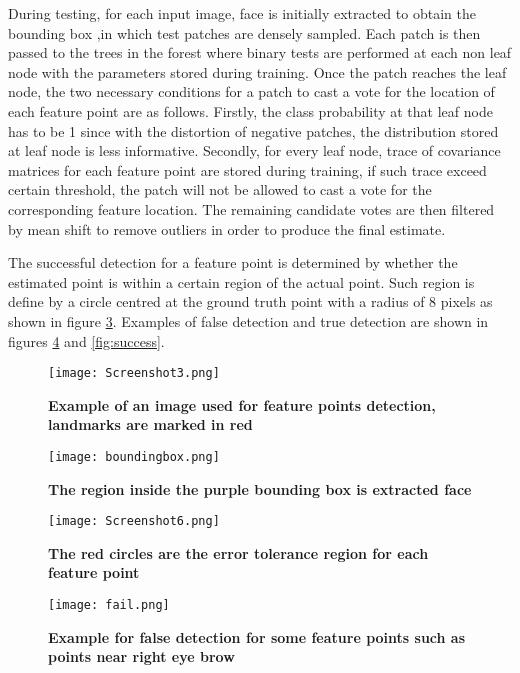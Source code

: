 During testing, for each input image, face is initially extracted to obtain the bounding box ,in which test patches are densely sampled. Each patch is then passed to the trees in the forest where binary tests are performed at each non leaf node with the parameters stored during training. Once the patch reaches the leaf node, the two necessary conditions for a patch to cast a vote for the location of each feature point are as follows. Firstly, the class probability at that leaf node has to be 1 since with the distortion of negative patches, the distribution stored at leaf node is less informative. Secondly, for every leaf node, trace of covariance matrices for each feature point are stored during training, if such trace exceed certain threshold, the patch will not be allowed to cast a vote for the corresponding feature location. The remaining candidate votes are then filtered by mean shift to remove outliers in order to produce the final estimate.

The successful detection for a feature point is determined by whether the estimated point is within a certain region of the actual point. Such region is define by a circle centred at the ground truth point with a radius of 8 pixels as shown in figure \ref{fig:successregion}. Examples of false detection and true detection are shown in figures \ref{fig:fail} and \ref{fig:success}.


\begin{figure}
	\centering
	\texttt{[image: Screenshot3.png]}
	\caption[Landmarks chosen for experiment]{\label{fig:expimage}}  \textbf{Example of an image used for feature points detection, landmarks are marked in red }
\end{figure}

\begin{figure}
	\centering
	\texttt{[image: boundingbox.png]}
	\caption[Face detection]{\label{fig:boundingbox}}  \textbf{The region inside the purple bounding box is extracted face }
\end{figure}

\begin{figure}
	\centering
	\texttt{[image: Screenshot6.png]}
	\caption[Landmarks Success Region]{\label{fig:successregion}}  \textbf{The red circles are the error tolerance region for each feature point}
\end{figure}

\begin{figure}
	\centering
	\texttt{[image: fail.png]}
	\caption[False Detection]{\label{fig:fail}}  \textbf{Example for false detection for some feature points such as points near right eye brow}
\end{figure}

